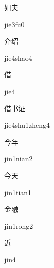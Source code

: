 \begin{verbete}[jie3fu0]{姐夫}
\begin{pronuncia}{jie3fu0}
\end{pronuncia}
\end{verbete}

\begin{verbete}{介绍} 
\begin{pronuncia}{jie4shao4}
\end{pronuncia}
\end{verbete}

\begin{verbete}[jie4]{借} 
\begin{pronuncia}{jie4}
\end{pronuncia}
\end{verbete}

\begin{verbete}{借书证} 
\begin{pronuncia}{jie4shu1zheng4}
\end{pronuncia}
\end{verbete}

\begin{verbete}{今年}
\begin{pronuncia}{jin1nian2}
\end{pronuncia}
\end{verbete}

\begin{verbete}{今天}
\begin{pronuncia}{jin1tian1}
\end{pronuncia}
\end{verbete}

\begin{verbete}{金融}
\begin{pronuncia}{jin1rong2}
\end{pronuncia}
\end{verbete}

\begin{verbete}[jin4]{近}
\begin{pronuncia}{jin4}
\end{pronuncia}
\end{verbete}

